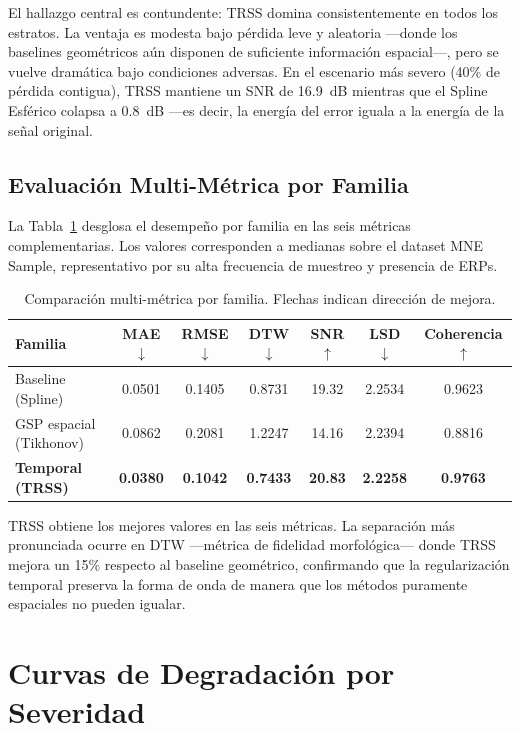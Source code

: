 El hallazgo central es contundente: TRSS domina consistentemente en todos los estratos. La ventaja es modesta bajo pérdida leve y aleatoria —donde los baselines geométricos aún disponen de suficiente información espacial—, pero se vuelve dramática bajo condiciones adversas. En el escenario más severo (40\% de pérdida contigua), TRSS mantiene un SNR de 16.9~dB mientras que el Spline Esférico colapsa a 0.8~dB —es decir, la energía del error iguala a la energía de la señal original.

\subsection{Evaluación Multi-Métrica por Familia}

La Tabla~\ref{tab:multimetric} desglosa el desempeño por familia en las seis métricas complementarias. Los valores corresponden a medianas sobre el dataset MNE Sample, representativo por su alta frecuencia de muestreo y presencia de ERPs.

\begin{table}[ht]
\centering
\caption{Comparación multi-métrica por familia. Flechas indican dirección de mejora.}
\label{tab:multimetric}
\begin{tabular}{lcccccc}
\toprule
\textbf{Familia} & \textbf{MAE} $\downarrow$ & \textbf{RMSE} $\downarrow$ & \textbf{DTW} $\downarrow$ & \textbf{SNR} $\uparrow$ & \textbf{LSD} $\downarrow$ & \textbf{Coherencia} $\uparrow$ \\
\midrule
Baseline (Spline) & 0.0501 & 0.1405 & 0.8731 & 19.32 & 2.2534 & 0.9623 \\
GSP espacial (Tikhonov) & 0.0862 & 0.2081 & 1.2247 & 14.16 & 2.2394 & 0.8816 \\
\textbf{Temporal (TRSS)} & \textbf{0.0380} & \textbf{0.1042} & \textbf{0.7433} & \textbf{20.83} & \textbf{2.2258} & \textbf{0.9763} \\
\bottomrule
\end{tabular}
\end{table}

TRSS obtiene los mejores valores en las seis métricas. La separación más pronunciada ocurre en DTW —métrica de fidelidad morfológica— donde TRSS mejora un 15\% respecto al baseline geométrico, confirmando que la regularización temporal preserva la forma de onda de manera que los métodos puramente espaciales no pueden igualar.

\section{Curvas de Degradación por Severidad}

